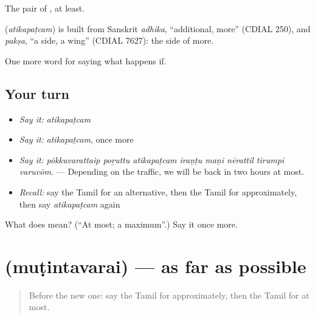 The pair of , at least.

\begin{cousinweb}
\textbf{} (\emph{atikapaṭcam}) is built from Sanskrit \emph{adhika}, \textquotedblleft{}additional, more\textquotedblright{} (CDIAL 250), and \emph{pakṣa}, \textquotedblleft{}a side, a wing\textquotedblright{} (CDIAL 7627): the side of more.
\end{cousinweb}

\begin{grammarlens}[title={What you've built}]
One more word for saying what happens if.
\end{grammarlens}

\subsection*{Your turn}
\begin{itemize}
\raggedright
  \item \emph{Say it:} \emph{atikapaṭcam}
  \item \emph{Say it:} \emph{atikapaṭcam}, once more
  \item \emph{Say it:} \emph{pōkkuvarattaip poṟuttu atikapaṭcam iraṇṭu maṇi nērattil tirumpi varuvōm.} — Depending on the traffic, we will be back in two hours at most.
  \item \emph{Recall:} say the Tamil for an alternative, then the Tamil for approximately, then say \emph{atikapaṭcam} again
\end{itemize}

\begin{tcolorbox}[breakable,colback=teal!4,colframe=teal!35!black,title={Before you move on}]
What does  mean? (\textquotedblleft{}At most; a maximum\textquotedblright{}.) Say it once more.
\end{tcolorbox}
\section[\texorpdfstring{\ta{முடிந்தவரை} (muṭintavarai)}{முடிந்தவரை (muṭintavarai)}]{ (muṭintavarai) — as far as possible}

\label{lesson:TA-C554-mutintavarai}



\begin{quote}
Before the new one: say the Tamil for approximately, then the Tamil for at most.
\end{quote}

